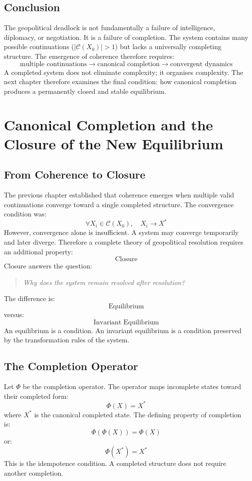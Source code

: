 \documentclass[11pt,openany]{book}
\theoremstyle{plain}
\theoremstyle{definition}
\begin{document}
\section{Conclusion}

The geopolitical deadlock is not fundamentally a failure of intelligence, diplomacy, or negotiation. It is a failure of completion. The system contains many possible continuations (\(|\mathcal{C}(X_0)| > 1\)) but lacks a universally completing structure. The emergence of coherence therefore requires:
\[
\boxed{
\text{multiple continuations} \longrightarrow \text{canonical completion} \longrightarrow \text{convergent dynamics}
}
\]
A completed system does not eliminate complexity; it organises complexity. The next chapter therefore examines the final condition: how canonical completion produces a permanently closed and stable equilibrium.


\chapter{Canonical Completion and the Closure of the New Equilibrium}

\section{From Coherence to Closure}

The previous chapter established that coherence emerges when multiple valid continuations converge toward a single completed structure. The convergence condition was:
\[
\forall X_i \in \mathcal{C}(X_0), \quad X_i \to X^*
\]
However, convergence alone is insufficient. A system may converge temporarily and later diverge. Therefore a complete theory of geopolitical resolution requires an additional property:
\[
\boxed{
\text{Closure}
}
\]
Closure answers the question:
\begin{quote}
\textit{Why does the system remain resolved after resolution?}
\end{quote}
The difference is:
\[
\text{Equilibrium}
\]
versus:
\[
\text{Invariant Equilibrium}
\]
An equilibrium is a condition. An invariant equilibrium is a condition preserved by the transformation rules of the system.

\section{The Completion Operator}

Let \(\Phi\) be the completion operator. The operator maps incomplete states toward their completed form:
\[
\Phi(X) = X^*
\]
where \(X^*\) is the canonical completed state. The defining property of completion is:
\[
\Phi(\Phi(X)) = \Phi(X)
\]
or:
\[
\boxed{
\Phi(X^*) = X^*
}
\]
This is the idempotence condition. A completed structure does not require another completion.
\end{document}
